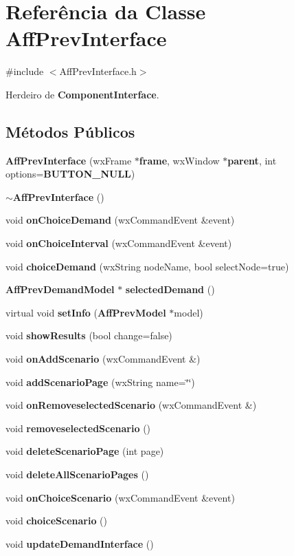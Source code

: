 \section{Referência da Classe Aff\+Prev\+Interface}
\label{class_aff_prev_interface}


{\ttfamily \#include $<$Aff\+Prev\+Interface.\+h$>$}



Herdeiro de {\bf Component\+Interface}.

\subsection*{Métodos Públicos}
\begin{DoxyCompactItemize}
\item 
{\bf Aff\+Prev\+Interface} (wx\+Frame $\ast${\bf frame}, wx\+Window $\ast${\bf parent}, int options={\bf B\+U\+T\+T\+O\+N\+\_\+\+N\+U\+LL})
\item 
{\bf $\sim$\+Aff\+Prev\+Interface} ()
\item 
void {\bf on\+Choice\+Demand} (wx\+Command\+Event \&event)
\item 
void {\bf on\+Choice\+Interval} (wx\+Command\+Event \&event)
\item 
void {\bf choice\+Demand} (wx\+String node\+Name, bool select\+Node=true)
\item 
{\bf Aff\+Prev\+Demand\+Model} $\ast$ {\bf selected\+Demand} ()
\item 
virtual void {\bf set\+Info} ({\bf Aff\+Prev\+Model} $\ast$model)
\item 
void {\bf show\+Results} (bool change=false)
\item 
void {\bf on\+Add\+Scenario} (wx\+Command\+Event \&)
\item 
void {\bf add\+Scenario\+Page} (wx\+String name=\char`\"{}\char`\"{})
\item 
void {\bf on\+Removeselected\+Scenario} (wx\+Command\+Event \&)
\item 
void {\bf removeselected\+Scenario} ()
\item 
void {\bf delete\+Scenario\+Page} (int page)
\item 
void {\bf delete\+All\+Scenario\+Pages} ()
\item 
void {\bf on\+Choice\+Scenario} (wx\+Command\+Event \&event)
\item 
void {\bf choice\+Scenario} ()
\item 
void {\bf update\+Demand\+Interface} ()
\end{DoxyCompactItemize}

